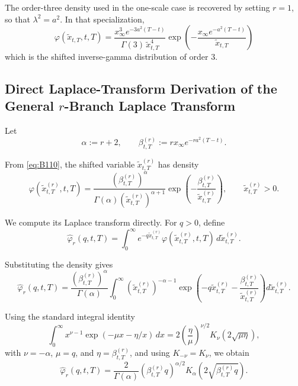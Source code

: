 \documentclass[12pt]{article}
\theoremstyle{statementstyle}
\begin{document}
\begin{appendices}
The order-three density used in the one-scale case is recovered by setting \(r=1\), so that
\(\lambda^{2}=a^{2}\). In that specialization,
\begin{equation}
\boxed{
\varphi(\widetilde{x}_{t,T},t,T)
=
\frac{x_{\infty}^{3}e^{-3a^{2}(T-t)}}{\Gamma(3)\,\widetilde{x}_{t,T}^{4}}
\exp\!\left(
-\frac{x_{\infty}e^{-a^{2}(T-t)}}{\widetilde{x}_{t,T}}
\right)
}
\tag{B.1.12}\label{eq:B112}
\end{equation}
which is the shifted inverse-gamma distribution of order \(3\).

\subsection{Direct Laplace-Transform Derivation of the General \(r\)-Branch Laplace Transform}
\label{appendix:B2}

Let
\[
\alpha := r+2,
\qquad
\beta_{t,T}^{(r)} := r x_{\infty}e^{-ra^{2}(T-t)}.
\]

From \eqref{eq:B110}, the shifted variable \(\widetilde{x}^{(r)}_{t,T}\) has density
\[
\varphi(\widetilde{x}^{(r)}_{t,T},t,T)
=
\frac{\left(\beta_{t,T}^{(r)}\right)^{\alpha}}
{\Gamma(\alpha)\left(\widetilde{x}^{(r)}_{t,T}\right)^{\alpha+1}}
\exp\!\left(
-\frac{\beta_{t,T}^{(r)}}{\widetilde{x}^{(r)}_{t,T}}
\right),
\qquad
\widetilde{x}^{(r)}_{t,T}>0.
\]

We compute its Laplace transform directly. For \(q>0\), define
\[
\widehat{\varphi}_{r}(q,t,T)
=
\int_{0}^{\infty}
 e^{-q\widetilde{x}^{(r)}_{t,T}}
 \varphi(\widetilde{x}^{(r)}_{t,T},t,T)
 \,d\widetilde{x}^{(r)}_{t,T}.
\]

Substituting the density gives
\begin{equation}
\widehat{\varphi}_{r}(q,t,T)
=
\frac{\left(\beta_{t,T}^{(r)}\right)^{\alpha}}{\Gamma(\alpha)}
\int_{0}^{\infty}
\left(\widetilde{x}^{(r)}_{t,T}\right)^{-\alpha-1}
\exp\!\left(
-q\widetilde{x}^{(r)}_{t,T}
-\frac{\beta_{t,T}^{(r)}}{\widetilde{x}^{(r)}_{t,T}}
\right)
d\widetilde{x}^{(r)}_{t,T}.
\tag{B.2.1}\label{eq:B21}
\end{equation}

Using the standard integral identity
\[
\int_{0}^{\infty}
x^{\nu-1}
\exp\!\left(-\mu x-\eta/x\right)\,dx
=
2\left(\frac{\eta}{\mu}\right)^{\nu/2}
K_{\nu}\!\left(2\sqrt{\mu\eta}\right),
\]
with \(\nu=-\alpha\), \(\mu=q\), and \(\eta=\beta_{t,T}^{(r)}\), and using
\(K_{-\nu}=K_{\nu}\), we obtain
\begin{equation}
\widehat{\varphi}_{r}(q,t,T)
=
\frac{2}{\Gamma(\alpha)}
\left(\beta_{t,T}^{(r)}q\right)^{\alpha/2}
K_{\alpha}\!\left(2\sqrt{\beta_{t,T}^{(r)}q}\right).
\tag{B.2.2}\label{eq:B22}
\end{equation}


\end{appendices}
\end{document}
